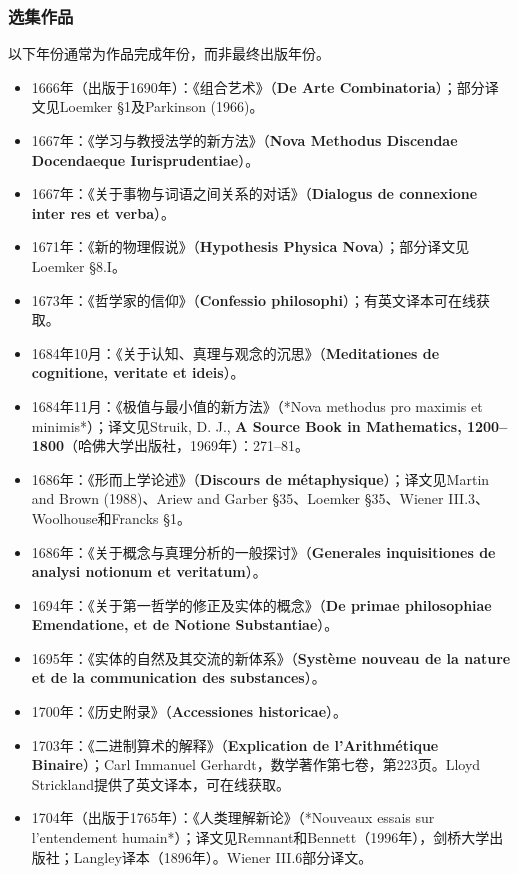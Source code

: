 \subsubsection{选集作品}  
以下年份通常为作品完成年份，而非最终出版年份。
\begin{itemize}
\item 1666年（出版于1690年）：《组合艺术》（\textbf{De Arte Combinatoria}）；部分译文见Loemker §1及Parkinson (1966)。  
\item 1667年：《学习与教授法学的新方法》（\textbf{Nova Methodus Discendae Docendaeque Iurisprudentiae}）。  
\item 1667年：《关于事物与词语之间关系的对话》（\textbf{Dialogus de connexione inter res et verba}）。  
\item 1671年：《新的物理假说》（\textbf{Hypothesis Physica Nova}）；部分译文见Loemker §8.I。  
\item 1673年：《哲学家的信仰》（\textbf{Confessio philosophi}）；有英文译本可在线获取。  
\item 1684年10月：《关于认知、真理与观念的沉思》（\textbf{Meditationes de cognitione, veritate et ideis}）。  
\item 1684年11月：《极值与最小值的新方法》（*Nova methodus pro maximis et minimis*）；译文见Struik, D. J., \textbf{A Source Book in Mathematics, 1200–1800}（哈佛大学出版社，1969年）：271–81。  
\item 1686年：《形而上学论述》（\textbf{Discours de métaphysique}）；译文见Martin and Brown (1988)、Ariew and Garber §35、Loemker §35、Wiener III.3、Woolhouse和Francks §1。  
\item 1686年：《关于概念与真理分析的一般探讨》（\textbf{Generales inquisitiones de analysi notionum et veritatum}）。  
\item 1694年：《关于第一哲学的修正及实体的概念》（\textbf{De primae philosophiae Emendatione, et de Notione Substantiae}）。  
\item 1695年：《实体的自然及其交流的新体系》（\textbf{Système nouveau de la nature et de la communication des substances}）。  
\item 1700年：《历史附录》（\textbf{Accessiones historicae}）。  
\item 1703年：《二进制算术的解释》（\textbf{Explication de l'Arithmétique Binaire}）；Carl Immanuel Gerhardt，数学著作第七卷，第223页。Lloyd Strickland提供了英文译本，可在线获取。  
\item 1704年（出版于1765年）：《人类理解新论》（*Nouveaux essais sur l'entendement humain*）；译文见Remnant和Bennett（1996年），剑桥大学出版社；Langley译本（1896年）。Wiener III.6部分译文。  

\end{itemize}
